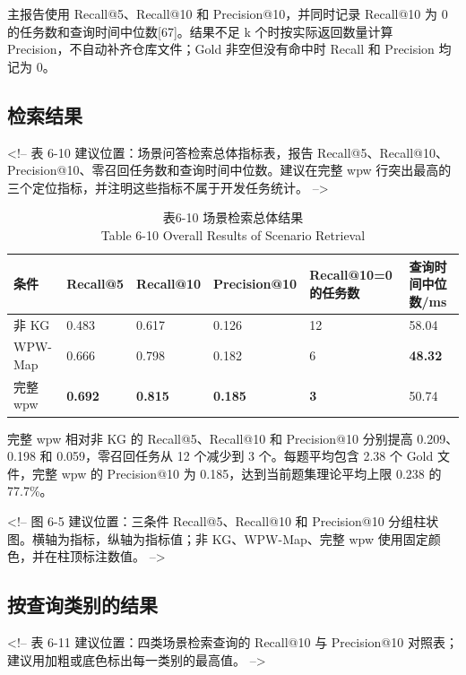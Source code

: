 主报告使用 Recall@5、Recall@10 和 Precision@10，并同时记录 Recall@10 为 0 的任务数和查询时间中位数[67]。结果不足 k 个时按实际返回数量计算 Precision，不自动补齐仓库文件；Gold 非空但没有命中时 Recall 和 Precision 均记为 0。


\subsection{检索结果}
<!-- 表 6-10 建议位置：场景问答检索总体指标表，报告 Recall@5、Recall@10、Precision@10、零召回任务数和查询时间中位数。建议在完整 wpw 行突出最高的三个定位指标，并注明这些指标不属于开发任务统计。 -->

\begin{table}[htbp]
\centering
\small
\caption{表6-10 场景检索总体结果\\Table 6-10 Overall Results of Scenario Retrieval}
\begin{tabularx}{\textwidth}{|X|X|X|X|X|X|}
\hline
\textbf{条件} & \textbf{Recall@5} & \textbf{Recall@10} & \textbf{Precision@10} & \textbf{Recall@10=0 的任务数} & \textbf{查询时间中位数/ms} \\
\hline
非 KG & 0.483 & 0.617 & 0.126 & 12 & 58.04 \\
WPW-Map & 0.666 & 0.798 & 0.182 & 6 & \textbf{48.32} \\
完整 wpw & \textbf{0.692} & \textbf{0.815} & \textbf{0.185} & \textbf{3} & 50.74 \\
\hline
\end{tabularx}
\end{table}

完整 wpw 相对非 KG 的 Recall@5、Recall@10 和 Precision@10 分别提高 0.209、0.198 和 0.059，零召回任务从 12 个减少到 3 个。每题平均包含 2.38 个 Gold 文件，完整 wpw 的 Precision@10 为 0.185，达到当前题集理论平均上限 0.238 的 77.7\%。

<!-- 图 6-5 建议位置：三条件 Recall@5、Recall@10 和 Precision@10 分组柱状图。横轴为指标，纵轴为指标值；非 KG、WPW-Map、完整 wpw 使用固定颜色，并在柱顶标注数值。 -->


\subsection{按查询类别的结果}
<!-- 表 6-11 建议位置：四类场景检索查询的 Recall@10 与 Precision@10 对照表；建议用加粗或底色标出每一类别的最高值。 -->


